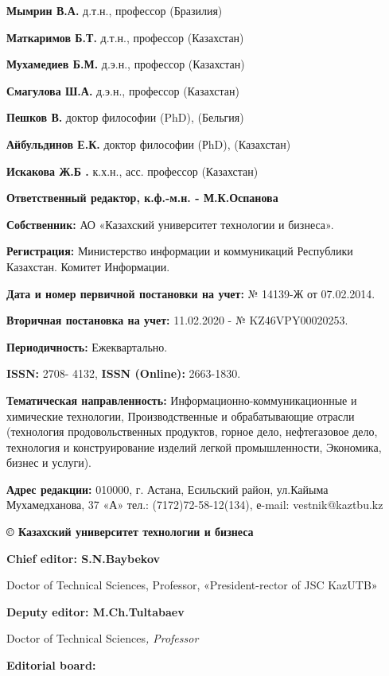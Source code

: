 {\bfseries Мымрин В.А.} д.т.н., профессор (Бразилия)

{\bfseries Маткаримов Б.Т.} д.т.н., профессор (Казахстан)

{\bfseries Мухамедиев Б.М.} д.э.н., профессор (Казахстан)

{\bfseries Смагулова Ш.А.} д.э.н., профессор (Казахстан)

{\bfseries Пешков В.} доктор философии (PhD), (Бельгия)

{\bfseries Айбульдинов Е.К.} доктор философии (РhD), (Казахстан)

{\bfseries Искакова Ж.Б .} к.х.н., асс. профессор (Казахстан)

\begin{center}
{\bfseries Ответственный редактор, к.ф.-м.н. - М.К.Оспанова}
\end{center}

{\bfseries Собственник:} АО «Казахский университет технологии и бизнеса».

{\bfseries Регистрация:} Министерство информации и коммуникаций Республики
Казахстан. Комитет Информации.

{\bfseries Дата и номер первичной постановки на учет:} № 14139-Ж от
07.02.2014.

{\bfseries Вторичная постановка на учет:} 11.02.2020 - № KZ46VPY00020253.

{\bfseries Периодичность:} Ежеквартально.

{\bfseries ISSN:} 2708- 4132, {\bfseries ISSN (Online):} 2663-1830.

{\bfseries Тематическая направленность:} Информационно-коммуникационные и
химические технологии, Производственные и обрабатывающие отрасли (технология
продовольственных продуктов, горное дело, нефтегазовое дело, технология и
конструирование изделий легкой промышленности, Экономика, бизнес и
услуги).

{\bfseries Адрес редакции:} 010000, г. Астана, Есильский район, ул.Кайыма
Мухамедханова, 37 «А» тел.: (7172)72-58-12(134), е-mail: vestnik@kaztbu.kz

\begin{center}
{\bfseries \large © Казахский университет технологии и бизнеса}
\end{center}

\pagebreak

\begin{center}
{\bfseries Chief editor: S.N.Baybekov}

Doctor of Technical Sciences, Professor, «President-rector of JSC
KazUTB»

{\bfseries Deputy editor: M.Ch.Tultabaev}

Doctor of Technical Sciences\emph{, Professor}

{\bfseries Editorial board:}
\end{center}

